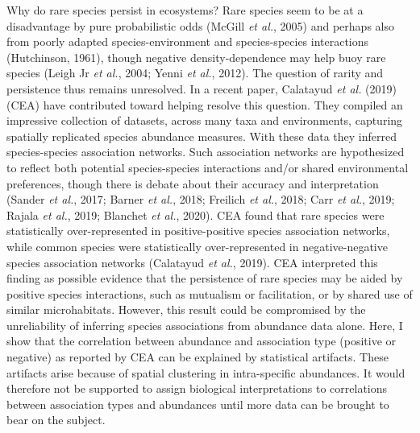 \documentclass[
]{article}
\begin{document}
Why do rare species persist in ecosystems? Rare species seem to be at a
disadvantage by pure probabilistic odds (McGill \emph{et al.}, 2005) and
perhaps also from poorly adapted species-environment and species-species
interactions (Hutchinson, 1961), though negative density-dependence may
help buoy rare species (Leigh Jr \emph{et al.}, 2004; Yenni \emph{et
al.}, 2012). The question of rarity and persistence thus remains
unresolved. In a recent paper, Calatayud \emph{et al.} (2019) (CEA) have
contributed toward helping resolve this question. They compiled an
impressive collection of datasets, across many taxa and environments,
capturing spatially replicated species abundance measures. With these
data they inferred species-species association networks. Such
association networks are hypothesized to reflect both potential
species-species interactions and/or shared environmental preferences,
though there is debate about their accuracy and interpretation (Sander
\emph{et al.}, 2017; Barner \emph{et al.}, 2018; Freilich \emph{et al.},
2018; Carr \emph{et al.}, 2019; Rajala \emph{et al.}, 2019; Blanchet
\emph{et al.}, 2020). CEA found that rare species were statistically
over-represented in positive-positive species association networks,
while common species were statistically over-represented in
negative-negative species association networks (Calatayud \emph{et al.},
2019). CEA interpreted this finding as possible evidence that the
persistence of rare species may be aided by positive species
interactions, such as mutualism or facilitation, or by shared use of
similar microhabitats. However, this result could be compromised by the
unreliability of inferring species associations from abundance data
alone. Here, I show that the correlation between abundance and
association type (positive or negative) as reported by CEA can be
explained by statistical artifacts. These artifacts arise because of
spatial clustering in intra-specific abundances. It would therefore not
be supported to assign biological interpretations to correlations
between association types and abundances until more data can be brought
to bear on the subject.
\end{document}
